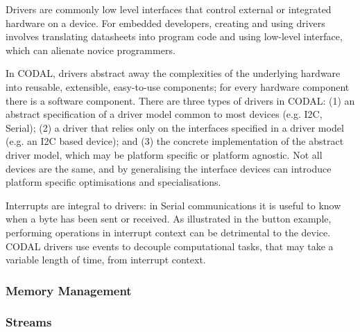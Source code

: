 Drivers are commonly low level interfaces that control external or integrated hardware on a device. For embedded developers, creating and using drivers involves translating datasheets into program code and using low-level interface, which can alienate novice programmers.

In CODAL, drivers abstract away the complexities of the underlying hardware into reusable, extensible, easy-to-use components; for every hardware component there is a software component. There are three types of drivers in CODAL: (1) an abstract specification of a driver model common to most devices (e.g. I2C, Serial); (2) a driver that relies only on the interfaces specified in a driver model  (e.g. an I2C based device); and (3) the concrete implementation of the abstract driver model, which may be platform specific or platform agnostic. Not all devices are the same, and by generalising the interface devices can introduce platform specific optimisations and specialisations.

Interrupts are integral to drivers: in Serial communications it is useful to know when a byte has been sent or received. As illustrated in the button example, performing operations in interrupt context can be detrimental to the device. CODAL drivers use events to decouple computational tasks, that may take a variable length of time, from interrupt context.


\subsubsection{Memory Management}


\subsubsection{Streams}


